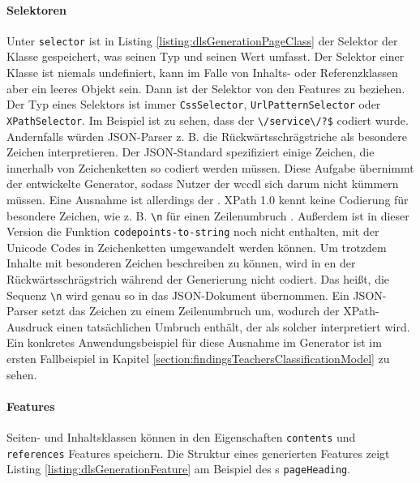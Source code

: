     \paragraph*{Selektoren}
    Unter \texttt{selector} ist in Listing \ref{listing:dlsGenerationPageClass}
    der Selektor der Klasse gespeichert,
    was seinen Typ und seinen Wert umfasst.
    Der Selektor einer Klasse ist niemals undefiniert,
    kann im Falle von Inhalts- oder Referenzklassen aber ein leeres Objekt sein.
    Dann ist der Selektor von den Features zu beziehen.
    Der Typ eines Selektors ist immer \texttt{CssSelector},
    \texttt{UrlPatternSelector} oder \texttt{XPathSelector}.
    Im Beispiel ist zu sehen, dass der {\urlSelector} \verb+\/service\/?$+ codiert wurde.
    Andernfalls würden JSON-Parser z. B. die Rückwärtsschrägstriche als besondere Zeichen interpretieren.
    Der JSON-Standard \cite[Kapitel 7]{rfc:8259} spezifiziert einige Zeichen,
    die innerhalb von Zeichenketten so codiert werden müssen.
    Diese Aufgabe übernimmt der entwickelte Generator,
    sodass Nutzer der \gls{wccdl} sich darum nicht kümmern müssen.
    Eine Ausnahme ist allerdings der {\xpathSelector}.
    XPath 1.0 kennt keine Codierung für besondere Zeichen,
    wie z. B. \texttt{\textbackslash{n}} für einen Zeilenumbruch \cite{w3c:xpath}.
    Außerdem ist in dieser Version die Funktion
    \texttt{codepoints-to-string} \cite[Kapitel 5.2.1]{w3c:xpathXquery} noch nicht enthalten,
    mit der Unicode Codes in Zeichenketten umgewandelt werden können.
    Um trotzdem Inhalte mit besonderen Zeichen beschreiben zu können,
    wird in {\xpathSelector}en der Rückwärtsschrägstrich während der
    Generierung nicht codiert.
    Das heißt, die Sequenz \texttt{\textbackslash{n}} wird genau so in das JSON-Dokument übernommen.
    Ein JSON-Parser setzt das Zeichen zu einem Zeilenumbruch um,
    wodurch der XPath-Ausdruck einen tatsächlichen Umbruch enthält,
    der als solcher interpretiert wird.
    Ein konkretes Anwendungsbeispiel für diese Ausnahme im Generator
    ist im ersten Fallbeispiel in Kapitel \ref{section:findingsTeachersClassificationModel} zu sehen.

    \paragraph*{Features}
    Seiten- und Inhaltsklassen können in den Eigenschaften
    \texttt{contents} und \texttt{references} Features speichern.
    Die Struktur eines generierten Features zeigt Listing
    \ref{listing:dlsGenerationFeature} am Beispiel des {\contentFeature}s \texttt{pageHeading}.

